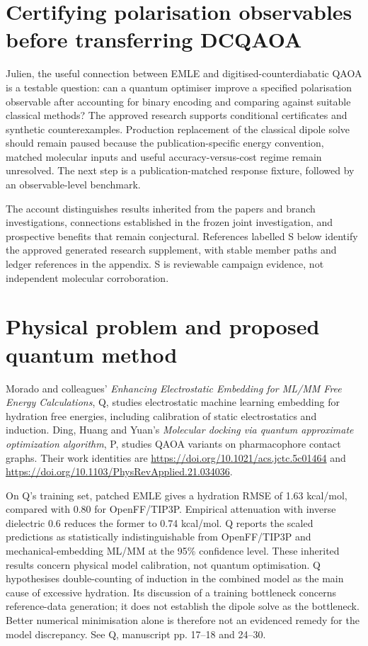 \documentclass{article}
\date{}
\begin{document}
\section{Certifying polarisation observables before transferring DCQAOA}

Julien, the useful connection between EMLE and digitised-counterdiabatic QAOA is a testable question: can a quantum optimiser improve a specified polarisation observable after accounting for binary encoding and comparing against suitable classical methods? The approved research supports conditional certificates and synthetic counterexamples. Production replacement of the classical dipole solve should remain paused because the publication-specific energy convention, matched molecular inputs and useful accuracy-versus-cost regime remain unresolved. The next step is a publication-matched response fixture, followed by an observable-level benchmark.

The account distinguishes results inherited from the papers and branch investigations, connections established in the frozen joint investigation, and prospective benefits that remain conjectural. References labelled S below identify the approved generated research supplement, with stable member paths and ledger references in the appendix. S is reviewable campaign evidence, not independent molecular corroboration.

\section{Physical problem and proposed quantum method}

Morado and colleagues' \emph{Enhancing Electrostatic Embedding for ML/MM Free Energy Calculations}, Q, studies electrostatic machine learning embedding for hydration free energies, including calibration of static electrostatics and induction. Ding, Huang and Yuan's \emph{Molecular docking via quantum approximate optimization algorithm}, P, studies QAOA variants on pharmacophore contact graphs. Their work identities are \url{https://doi.org/10.1021/acs.jctc.5c01464} and \url{https://doi.org/10.1103/PhysRevApplied.21.034036}.

On Q's training set, patched EMLE gives a hydration RMSE of 1.63 kcal/mol, compared with 0.80 for OpenFF/TIP3P. Empirical attenuation with inverse dielectric 0.6 reduces the former to 0.74 kcal/mol. Q reports the scaled predictions as statistically indistinguishable from OpenFF/TIP3P and mechanical-embedding ML/MM at the 95\% confidence level. These inherited results concern physical model calibration, not quantum optimisation. Q hypothesises double-counting of induction in the combined model as the main cause of excessive hydration. Its discussion of a training bottleneck concerns reference-data generation; it does not establish the dipole solve as the bottleneck. Better numerical minimisation alone is therefore not an evidenced remedy for the model discrepancy. See Q, manuscript pp. 17--18 and 24--30.
\end{document}

